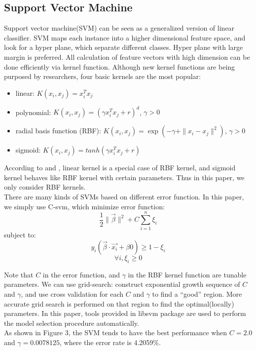 \documentclass[a4paper,11pt]{article}
\begin{document}
\subsection{Support Vector Machine}
Support vector machine(SVM) can be seen as a generalized version of linear classifier. SVM maps each instance into a higher dimensional feature space, and look for a hyper plane, which separate different classes. Hyper plane with large margin is preferred. All calculation of feature vectors with high dimension can be done efficiently via kernel function. Although new kernel functions are being purposed by researchers, four basic kernels are the most popular\cite{svm}:
\begin{itemize}
\item linear: $K(x_i,x_j)=x_i^Tx_j$\\
\item polynomial: $K(x_i,x_j)=(\gamma x_i^Tx_j+r)^d$, $\gamma >0$\\
\item radial basis function (RBF): $K(x_i,x_j)=\exp(-\gamma + \|x_i-x_j\|^2)$, $\gamma > 0$\\
\item sigmoid: $K(x_i,x_j)=tanh(\gamma x_i^Tx_j+r)$\\
\end{itemize}
According to \cite{ssk} and \cite{ll}, linear kernel is a special case of RBF kernel, and sigmoid kernel behaves like RBF kernel with certain parameters. Thus in this paper, we only consider RBF kernels.\\
There are many kinds of SVMs based on different error function. In this paper, we simply use C-svm, which minimize error function:
    $$\frac{1}{2}\|\vec{\beta}\|^2+C\sum_{i=1}^n \xi_i$$
 subject to:$$y_i(\vec{\beta}\cdot \vec{x_i}+\beta{0})\geq 1-\xi_i$$$$\forall i, \xi_i\geq 0$$

Note that $C$ in the error function, and $\gamma$ in the RBF kernel function are tunable parameters. We can use grid-search\cite{svm}: construct exponential growth sequence of $C$ and $\gamma$, and use cross validation for each $C$ and $\gamma$ to find a ``good'' region. More accurate grid search is performed on that region to find the optimal(locally) parameters. In this paper, tools provided in libsvm\cite{libsvm} package are used to perform the model selection procedure automatically.\\
As shown in Figure 3, the SVM tends to have the best performance when $C=2.0$ and $\gamma=0.0078125$, where the error rate is 4.2059\%.
\end{document}

